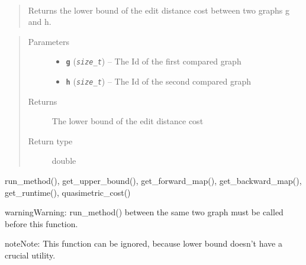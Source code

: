 \documentclass[letterpaper,10pt,english]{sphinxmanual}
\begin{document}
\begin{fulllineitems}
\label{doc:gedlibpy.get_lower_bound}~\begin{quote}

Returns the lower bound of the edit distance cost between two graphs g and h.
\end{quote}
\begin{quote}\begin{description}
\item[{Parameters}] \leavevmode\begin{itemize}
\item {} 
\textbf{\texttt{g}} (\emph{\texttt{size\_t}}) -- The Id of the first compared graph

\item {} 
\textbf{\texttt{h}} (\emph{\texttt{size\_t}}) -- The Id of the second compared graph

\end{itemize}

\item[{Returns}] \leavevmode
The lower bound of the edit distance cost

\item[{Return type}] \leavevmode
double

\end{description}\end{quote}




run\_method(), get\_upper\_bound(),  get\_forward\_map(), get\_backward\_map(), get\_runtime(), quasimetric\_cost()



\begin{notice}{warning}{Warning:}
run\_method() between the same two graph must be called before this function.
\end{notice}

\begin{notice}{note}{Note:}
This function can be ignored, because lower bound doesn't have a crucial utility.
\end{notice}

\end{fulllineitems}

\end{document}

